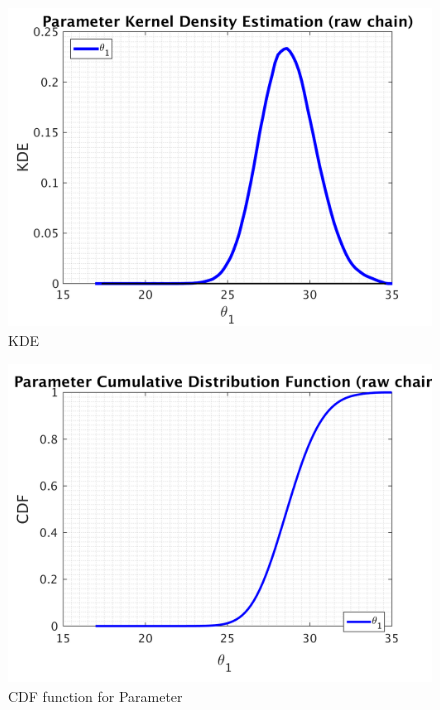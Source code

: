\begin{figure}[H]
  
  \centering
   \includegraphics[scale=0.75]{53_results/output_900000/simple_ip_kde_raw}
   \caption{ KDE }
\end{figure}

\begin{figure}[H]
  
  \centering
   \includegraphics[scale=0.75]{53_results/output_900000/simple_ip_cdf_raw}
   \caption{CDF function for Parameter }
\end{figure}



